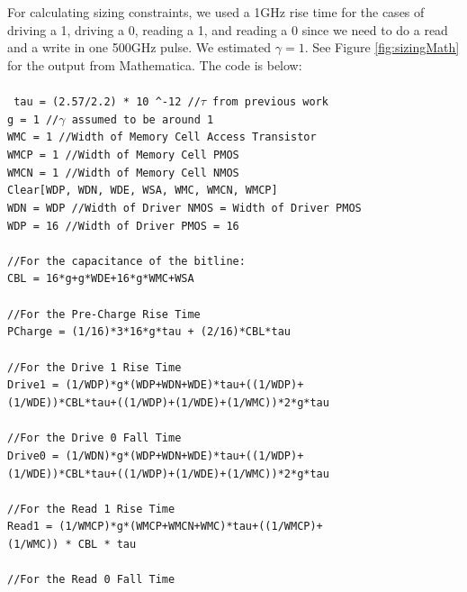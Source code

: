 \documentclass[a4paper]{article}
\def\code#1{\texttt{#1}}
\newcommand\tab[1][1cm]{\hspace*{#1}}
\begin{document}
For calculating sizing constraints, we used a 1GHz rise time for the cases of driving a 1, driving a 0, reading a 1, and reading a 0 since we need to do a read and a write in one 500GHz pulse. We estimated $\gamma = 1$. See Figure \ref{fig:sizingMath} for the output from Mathematica. The code is below:
\\\\\noindent
\code {
tau = (2.57/2.2) * 10 \textasciicircum -12 \textnormal{//$\tau$ from previous work}\\
g = 1 \textnormal{//$\gamma$ assumed to be around 1}\\
WMC = 1 \textnormal{//Width of Memory Cell Access Transistor}\\
WMCP = 1 \textnormal{//Width of Memory Cell PMOS}\\
WMCN = 1 \textnormal{//Width of Memory Cell NMOS}\\
Clear[WDP, WDN, WDE, WSA, WMC, WMCN, WMCP]\\
WDN = WDP \textnormal{//Width of Driver NMOS = Width of Driver PMOS}\\
WDP = 16 \textnormal{//Width of Driver PMOS = 16}\\
\\
\textnormal{//For the capacitance of the bitline:}\\
CBL = 16*g+g*WDE+16*g*WMC+WSA\\
\\
\textnormal{//For the Pre-Charge Rise Time}\\
PCharge = (1/16)*3*16*g*tau + (2/16)*CBL*tau\\
\\
\textnormal{//For the Drive 1 Rise Time}\\
Drive1 = (1/WDP)*g*(WDP+WDN+WDE)*tau+((1/WDP)+\\
\tab (1/WDE))*CBL*tau+((1/WDP)+(1/WDE)+(1/WMC))*2*g*tau\\
\\
\textnormal{//For the Drive 0 Fall Time}\\
Drive0 = (1/WDN)*g*(WDP+WDN+WDE)*tau+((1/WDP)+\\
\tab (1/WDE))*CBL*tau+((1/WDP)+(1/WDE)+(1/WMC))*2*g*tau\\
\\
\textnormal{//For the Read 1 Rise Time}\\
Read1 = (1/WMCP)*g*(WMCP+WMCN+WMC)*tau+((1/WMCP)+\\
\tab (1/WMC)) * CBL * tau\\
\\
\textnormal{//For the Read 0 Fall Time}\\
}
\end{document}
